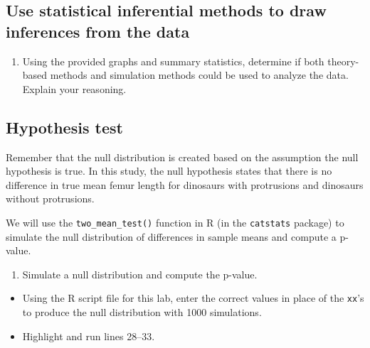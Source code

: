 \documentclass[
]{report}
\providecommand{\tightlist}{%
  \setlength{\itemsep}{0pt}\setlength{\parskip}{0pt}}
\begin{document}
\vspace{0.4in}

\hypertarget{use-statistical-inferential-methods-to-draw-inferences-from-the-data-5}{%
\subsection*{Use statistical inferential methods to draw inferences from the data}\label{use-statistical-inferential-methods-to-draw-inferences-from-the-data-5}}

\begin{enumerate}
\def\labelenumi{\arabic{enumi}.}
\setcounter{enumi}{8}
\tightlist
\item
  Using the provided graphs and summary statistics, determine if both theory-based methods and simulation methods could be used to analyze the data. Explain your reasoning.
\end{enumerate}

\vspace{0.8in}

\newpage

\hypertarget{hypothesis-test-3}{%
\subsection*{Hypothesis test}\label{hypothesis-test-3}}

Remember that the null distribution is created based on the assumption the null hypothesis is true. In this study, the null hypothesis states that there is no difference in true mean femur length for dinosaurs with protrusions and dinosaurs without protrusions.

We will use the \texttt{two\_mean\_test()} function in R (in the \texttt{catstats} package) to simulate the null distribution of differences in sample means and compute a p-value.

\begin{enumerate}
\def\labelenumi{\arabic{enumi}.}
\setcounter{enumi}{9}
\tightlist
\item
  Simulate a null distribution and compute the p-value.
\end{enumerate}

\begin{itemize}
\item
  Using the R script file for this lab, enter the correct values in place of the \texttt{xx}'s to produce the null distribution with 1000 simulations.
\item
  Highlight and run lines 28--33.
\end{itemize}
\end{document}
